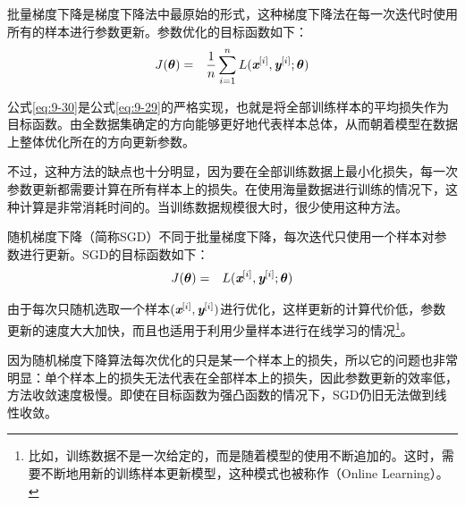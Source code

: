 \vspace{0.5em}

\parinterval 批量梯度下降是梯度下降法中最原始的形式，这种梯度下降法在每一次迭代时使用所有的样本进行参数更新。参数优化的目标函数如下：
\begin{eqnarray}
J({\bm \theta})&=&\frac{1}{n}\sum_{i=1}^{n}{L({\textbf{\em x}}^{[i]},{\textbf{\em y}}^{[i]};{\bm \theta})}
\label{eq:9-30}
\end{eqnarray}

\parinterval 公式\eqref{eq:9-30}是公式\eqref{eq:9-29}的严格实现，也就是将全部训练样本的平均损失作为目标函数。由全数据集确定的方向能够更好地代表样本总体，从而朝着模型在数据上整体优化所在的方向更新参数。

\parinterval 不过，这种方法的缺点也十分明显，因为要在全部训练数据上最小化损失，每一次参数更新都需要计算在所有样本上的损失。在使用海量数据进行训练的情况下，这种计算是非常消耗时间的。当训练数据规模很大时，很少使用这种方法。

%

\vspace{0.5em}
\vspace{0.5em}

\parinterval 随机梯度下降（简称SGD）不同于批量梯度下降，每次迭代只使用一个样本对参数进行更新。SGD的目标函数如下：
\begin{eqnarray}
J({\bm \theta})&=&L({\textbf{\em x}}^{[i]},{\textbf{\em y}}^{[i]};{\bm \theta})
\label{eq:9-31}
\end{eqnarray}

\noindent 由于每次只随机选取一个样本$({\textbf{\em x}}^{[i]},{\textbf{\em y}}^{[i]})$进行优化，这样更新的计算代价低，参数更新的速度大大加快，而且也适用于利用少量样本进行在线学习的情况\footnote{比如，训练数据不是一次给定的，而是随着模型的使用不断追加的。这时，需要不断地用新的训练样本更新模型，这种模式也被称作{\scriptsize{}}（Online Learning）。}。

\parinterval 因为随机梯度下降算法每次优化的只是某一个样本上的损失，所以它的问题也非常明显：单个样本上的损失无法代表在全部样本上的损失，因此参数更新的效率低，方法收敛速度极慢。即使在目标函数为强凸函数的情况下，SGD仍旧无法做到线性收敛。

